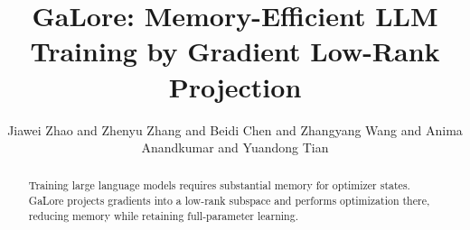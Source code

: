 \documentclass{article}
\title{GaLore: Memory-Efficient LLM Training by Gradient Low-Rank Projection}
\author{Jiawei Zhao and Zhenyu Zhang and Beidi Chen and Zhangyang Wang and Anima Anandkumar and Yuandong Tian}
\begin{document}
\maketitle
\begin{abstract}
Training large language models requires substantial memory for optimizer states.
GaLore projects gradients into a low-rank subspace and performs optimization there,
reducing memory while retaining full-parameter learning.
\end{abstract}



\end{document}
